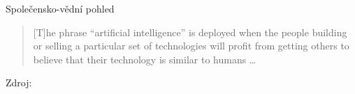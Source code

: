 
\begin{frame}{Společensko-vědní pohled}

    \begin{quote}
        [T]he phrase “artificial intelligence” is deployed when the people building
        or selling a particular set of technologies will profit from getting others
        to believe that their technology is similar to humans \ldots
    \end{quote}

    \vspace{10pt}

    {\footnotesize Zdroj: \citet{bender2025ai}}

\end{frame}


